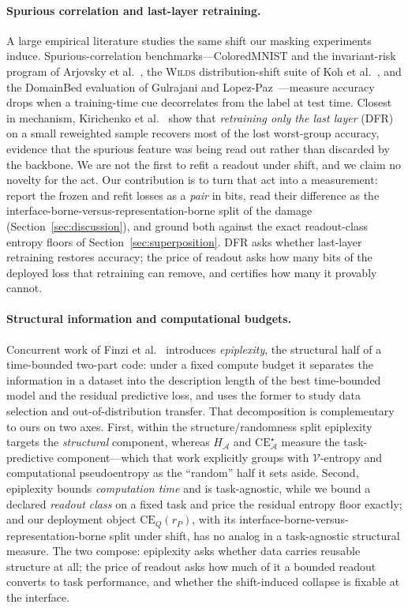 \documentclass[twocolumn,10pt]{article}
\theoremstyle{definition}
\theoremstyle{remark}
\newcommand{\cA}{\mathcal{A}}
\newcommand{\CE}{\mathrm{CE}}
\newcommand{\CEQ}[1]{\CE_{Q}({#1})}
\newcommand{\rP}{r_{P}}
\begin{document}
\paragraph{Spurious correlation and last-layer retraining.}
A large empirical literature studies the same shift our masking
experiments induce. Spurious-correlation benchmarks---ColoredMNIST and
the invariant-risk program of Arjovsky et al.~\cite{arjovskyirm}, the
\textsc{Wilds} distribution-shift suite of Koh et
al.~\cite{kohwilds}, and the DomainBed evaluation of Gulrajani and
Lopez-Paz~\cite{gulrajanidomainbed}---measure accuracy drops when a
training-time cue decorrelates from the label at test time. Closest in
mechanism, Kirichenko et al.~\cite{kirichenkodfr} show that
\emph{retraining only the last layer} (DFR) on a small reweighted
sample recovers most of the lost worst-group accuracy, evidence that
the spurious feature was being read out rather than discarded by the
backbone. We are not the first to refit a readout under shift, and we
claim no novelty for the act. Our contribution is to turn that act
into a measurement: report the frozen and refit losses as a
\emph{pair} in bits, read their difference as the
interface-borne-versus-representation-borne split of the damage
(Section~\ref{sec:discussion}), and ground both against the exact
readout-class entropy floors of Section~\ref{sec:superposition}. DFR
asks whether last-layer retraining restores accuracy; the price of
readout asks how many bits of the deployed loss that retraining can
remove, and certifies how many it provably cannot.

\paragraph{Structural information and computational budgets.}
Concurrent work of Finzi et al.~\cite{finziepiplexity} introduces
\emph{epiplexity}, the structural half of a time-bounded two-part
code: under a fixed compute budget it separates the information in a
dataset into the description length of the best time-bounded model and
the residual predictive loss, and uses the former to study data
selection and out-of-distribution transfer. That decomposition is
complementary to ours on two axes. First, within the
structure/randomness split epiplexity targets the \emph{structural}
component, whereas $H_{\cA}$ and $\CE^{\star}_{\cA}$ measure the
task-predictive component---which that work explicitly groups with
$\mathcal{V}$-entropy and computational pseudoentropy as the
``random'' half it sets aside. Second, epiplexity bounds
\emph{computation time} and is task-agnostic, while we bound a declared
\emph{readout class} on a fixed task and price the residual entropy
floor exactly; and our deployment object $\CEQ{\rP}$, with its
interface-borne-versus-representation-borne split under shift, has no
analog in a task-agnostic structural measure. The two compose:
epiplexity asks whether data carries reusable structure at all; the
price of readout asks how much of it a bounded readout converts to
task performance, and whether the shift-induced collapse is fixable at
the interface.
\end{document}
